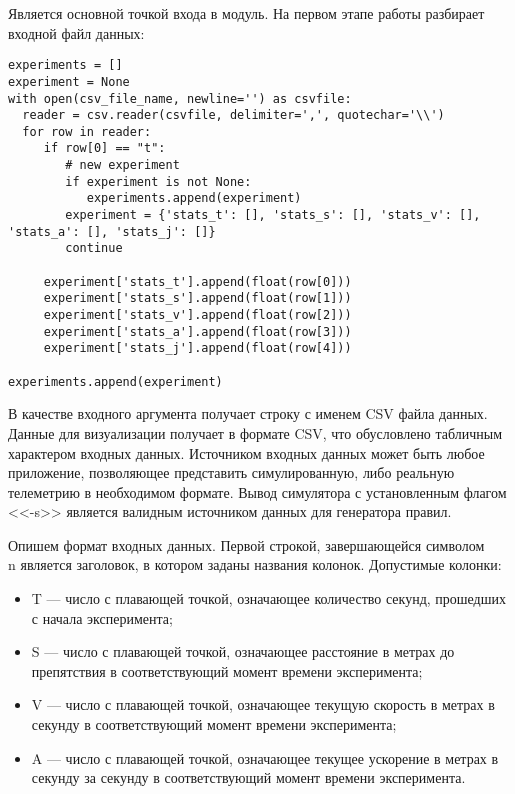 Является основной точкой входа в модуль. На первом этапе работы разбирает входной файл данных:

\begin{lstlisting}[style=pythonstyle,caption={  }, label=lst:func:1]
experiments = []
experiment = None
with open(csv_file_name, newline='') as csvfile:
  reader = csv.reader(csvfile, delimiter=',', quotechar='\\')
  for row in reader:
     if row[0] == "t":
        # new experiment
        if experiment is not None:
           experiments.append(experiment)
        experiment = {'stats_t': [], 'stats_s': [], 'stats_v': [], 'stats_a': [], 'stats_j': []}
        continue

     experiment['stats_t'].append(float(row[0]))
     experiment['stats_s'].append(float(row[1]))
     experiment['stats_v'].append(float(row[2]))
     experiment['stats_a'].append(float(row[3]))
     experiment['stats_j'].append(float(row[4]))

experiments.append(experiment)
\end{lstlisting}


В качестве входного аргумента получает строку с именем CSV файла данных. Данные для визуализации получает в формате CSV, что обусловлено табличным характером входных данных. Источником входных данных может быть любое приложение, позволяющее представить симулированную, либо реальную телеметрию в необходимом формате. Вывод симулятора с установленным флагом <<-s>> является валидным источником данных для генератора правил.

Опишем формат входных данных. Первой строкой, завершающейся символом \\n является заголовок, в котором заданы названия колонок. Допустимые колонки:

\begin{itemize}
	\item T — число с плавающей точкой, означающее количество секунд, прошедших с начала эксперимента;
	\item S — число с плавающей точкой, означающее расстояние в метрах до препятствия в соответствующий момент времени эксперимента;
	\item V — число с плавающей точкой, означающее текущую скорость в метрах в секунду в соответствующий момент времени эксперимента;
	\item A — число с плавающей точкой, означающее текущее ускорение в метрах в секунду за секунду в соответствующий момент времени эксперимента.
\end{itemize}

